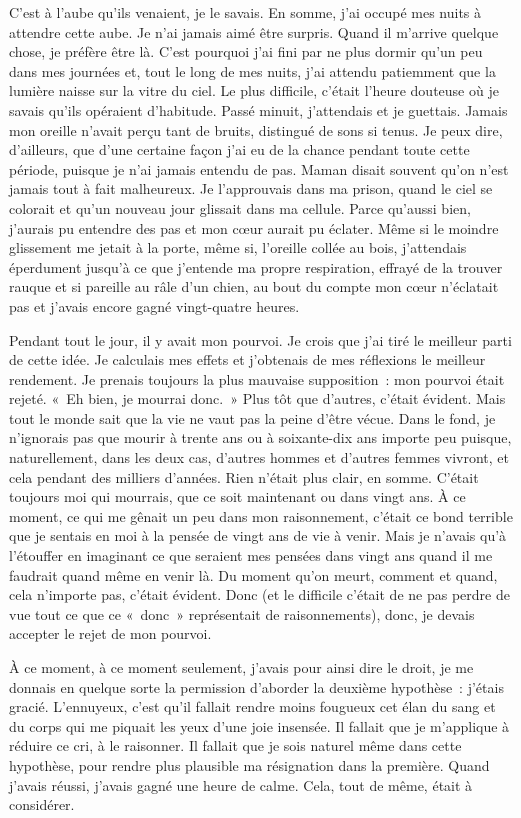 \documentclass[french,twoside]{book} %
\begin{document}
C'est à l’aube qu’ils venaient, je le savais. En somme, j’ai occupé mes nuits à attendre cette aube. Je n’ai jamais aimé être surpris. Quand il m’arrive quelque chose, je préfère être là. C'est pourquoi j’ai fini par ne plus dormir qu’un peu dans mes journées et, tout le long de mes nuits, j’ai attendu patiemment que la lumière naisse sur la vitre du ciel. Le plus difficile, c’était l’heure douteuse où je savais qu’ils opéraient d’habitude. Passé minuit, j’attendais et je guettais. Jamais mon oreille n’avait perçu tant de bruits, distingué de sons si tenus. Je peux dire, d’ailleurs, que d’une certaine façon j’ai eu de la chance pendant toute cette période, puisque je n’ai jamais entendu de pas. Maman disait souvent qu’on n’est jamais tout à fait malheureux. Je l’approuvais dans ma prison, quand le ciel se colorait et qu’un nouveau jour glissait dans ma cellule. Parce qu’aussi bien, j’aurais pu entendre des pas et mon cœur aurait pu éclater. Même si le moindre glissement me jetait à la porte, même si, l’oreille collée au bois, j’attendais éperdument jusqu’à ce que j’entende ma propre respiration, effrayé de la trouver rauque et si pareille au râle d’un chien, au bout du compte mon cœur n’éclatait pas et j’avais encore gagné vingt-quatre heures.\par
Pendant tout le jour, il y avait mon pourvoi. Je crois que j’ai tiré le meilleur parti de cette idée. Je calculais mes effets et j’obtenais de mes réflexions le meilleur rendement. Je prenais toujours la plus mauvaise supposition : mon pourvoi était rejeté. « Eh bien, je mourrai donc. » Plus tôt que d’autres, c’était évident. Mais tout le monde sait que la vie ne vaut pas la peine d’être vécue. Dans le fond, je n’ignorais pas que mourir à trente ans ou à soixante-dix ans importe peu puisque, naturellement, dans les deux cas, d’autres hommes et d’autres femmes vivront, et cela pendant des milliers d’années. Rien n’était plus clair, en somme. C'était toujours moi qui mourrais, que ce soit maintenant ou dans vingt ans. À ce moment, ce qui me gênait un peu dans mon raisonnement, c’était ce bond terrible que je sentais en moi à la pensée de vingt ans de vie à venir. Mais je n’avais qu’à l’étouffer en imaginant ce que seraient mes pensées dans vingt ans quand il me faudrait quand même en venir là. Du moment qu’on meurt, comment et quand, cela n’importe pas, c’était évident. Donc (et le difficile c’était de ne pas perdre de vue tout ce que ce « donc » représentait de raisonnements), donc, je devais accepter le rejet de mon pourvoi.\par
À ce moment, à ce moment seulement, j’avais pour ainsi dire le droit, je me donnais en quelque sorte la permission d’aborder la deuxième hypothèse : j’étais gracié. L'ennuyeux, c’est qu’il fallait rendre moins fougueux cet élan du sang et du corps qui me piquait les yeux d’une joie insensée. Il fallait que je m’applique à réduire ce cri, à le raisonner. Il fallait que je sois naturel même dans cette hypothèse, pour rendre plus plausible ma résignation dans la première. Quand j’avais réussi, j’avais gagné une heure de calme. Cela, tout de même, était à considérer.\par
\end{document}
